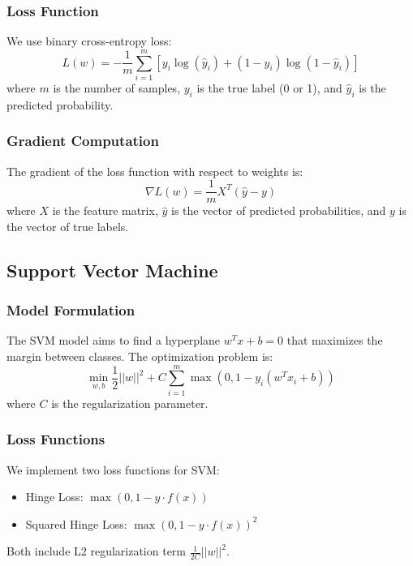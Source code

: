 \documentclass[journal, a4paper]{IEEEtran}
\begin{document}
\subsubsection{Loss Function}
We use binary cross-entropy loss:
\begin{equation}
L(w) = -\frac{1}{m}\sum_{i=1}^{m}[y_i\log(\hat{y}_i) + (1-y_i)\log(1-\hat{y}_i)]
\end{equation}
where $m$ is the number of samples, $y_i$ is the true label (0 or 1), and $\hat{y}_i$ is the predicted probability.

\subsubsection{Gradient Computation}
The gradient of the loss function with respect to weights is:
\begin{equation}
\nabla L(w) = \frac{1}{m} X^T (\hat{y} - y)
\end{equation}
where $X$ is the feature matrix, $\hat{y}$ is the vector of predicted probabilities, and $y$ is the vector of true labels.

\subsection{Support Vector Machine}
\subsubsection{Model Formulation}
The SVM model aims to find a hyperplane $w^T x + b = 0$ that maximizes the margin between classes. The optimization problem is:
\begin{equation}
\min_{w,b} \frac{1}{2} ||w||^2 + C\sum_{i=1}^{m} \max(0, 1 - y_i(w^T x_i + b))
\end{equation}
where $C$ is the regularization parameter.

\subsubsection{Loss Functions}
We implement two loss functions for SVM:

\begin{itemize}
    \item Hinge Loss: $\max(0, 1 - y \cdot f(x))$
    \item Squared Hinge Loss: $\max(0, 1 - y \cdot f(x))^2$
\end{itemize}

Both include L2 regularization term $\frac{1}{2C} ||w||^2$.
\end{document}
